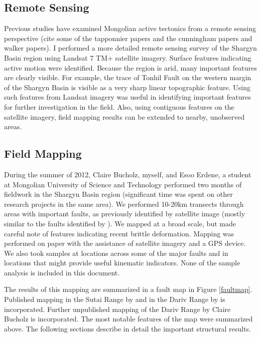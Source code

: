 \documentclass[10pt,a4paper]{article}
\begin{document}
\subsection{Remote Sensing}
Previous studies have examined Mongolian active tectonics from a remote sensing perspective (cite some of the tapponnier papers and the cunningham papers and walker papers). I performed a more detailed remote sensing survey of the Shargyn Basin region using Landsat 7 TM+ satellite imagery. Surface features indicating active motion were identified. Because the region is arid, many important features are clearly visible. For example, the trace of Tonhil Fault on the western margin of the Shargyn Basin is visible as a very sharp linear topographic feature. Using such features from Landsat imagery was useful in identifying important features for further investigation in the field. Also, using contiguous features on the satellite imagery, field mapping results can be extended to nearby, unobserved areas.

\subsection{Field Mapping}
During the summer of 2012, Claire Bucholz, myself, and Esoo Erdene, a student at Mongolian University of Science and Technology performed two months of fieldwork in the Shargyn Basin region (significant time was spent on other research projects in the same area). We performed 10-20km transects through areas with important faults, as previously identified by satellite image (mostly similar to the faults identified by \citep{Walker2007}). We mapped at a broad scale, but made careful note of features indicating recent brittle deformation. Mapping was performed on paper with the assistance of satellite imagery and a GPS device. We also took samples at locations across some of the major faults and in locations that might provide useful kinematic indicators. None of the sample analysis is included in this document. 

The results of this mapping are summarized in a fault map in Figure \ref{faultmap}. Published mapping in the Sutai Range by \citet{Cunningham2003} and in the Dariv Range by \citet{Dijkstra2006} is incorporated. Further unpublished mapping of the Dariv Range by Claire Bucholz is incorporated. The most notable features of the map were summarized above. The following sections describe in detail the important structural results. 
 
\end{document}
